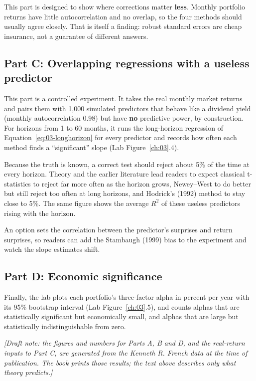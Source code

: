 This part is designed to show where corrections matter \textbf{less}. Monthly portfolio returns have little autocorrelation and no overlap, so the four methods should usually agree closely. That is itself a finding: robust standard errors are cheap insurance, not a guarantee of different answers.

\subsection*{Part C: Overlapping regressions with a useless predictor}

This part is a controlled experiment. It takes the real monthly market returns and pairs them with 1,000 simulated predictors that behave like a dividend yield (monthly autocorrelation 0.98) but have \textbf{no} predictive power, by construction. For horizons from 1 to 60 months, it runs the long-horizon regression of Equation~\eqref{eq:03-longhorizon} for every predictor and records how often each method finds a ``significant'' slope (Lab Figure~\ref{ch:03}.4).

Because the truth is known, a correct test should reject about 5\% of the time at every horizon. Theory and the earlier literature lead readers to expect classical t-statistics to reject far more often as the horizon grows, Newey--West to do better but still reject too often at long horizons, and Hodrick's (1992) method to stay close to 5\%. The same figure shows the average $R^2$ of these useless predictors rising with the horizon.

An option sets the correlation between the predictor's surprises and return surprises, so readers can add the Stambaugh (1999) bias to the experiment and watch the slope estimates shift.

\subsection*{Part D: Economic significance}

Finally, the lab plots each portfolio's three-factor alpha in percent per year with its 95\% bootstrap interval (Lab Figure~\ref{ch:03}.5), and counts alphas that are statistically significant but economically small, and alphas that are large but statistically indistinguishable from zero.

\emph{[Draft note: the figures and numbers for Parts A, B and D, and the real-return inputs to Part C, are generated from the Kenneth R. French data at the time of publication. The book prints those results; the text above describes only what theory predicts.]}

